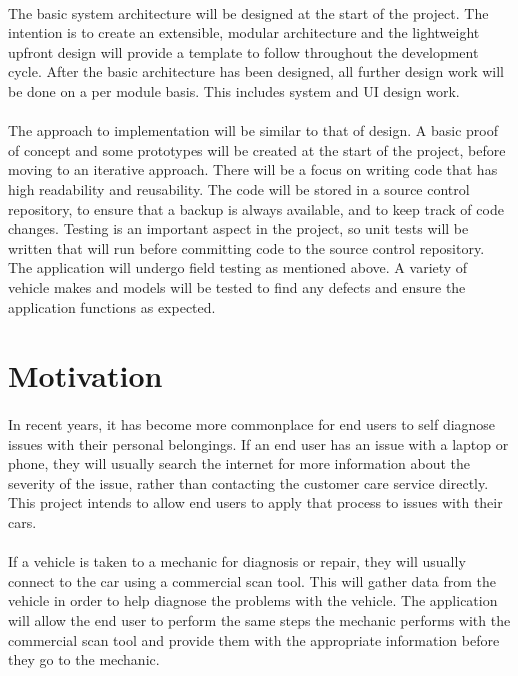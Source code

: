 	\paragraph{}{
	The basic system architecture will be designed at the start of the project. The intention is to create an extensible, modular architecture and the lightweight upfront design will provide a template to follow throughout the development cycle. After the basic architecture has been designed, all further design work will be done on a per module basis. This includes system and UI design work.
	}
	\paragraph{}{
 	The approach to implementation will be similar to that of design. A basic proof of concept and some prototypes will be created at the start of the project, before moving to an iterative approach. There will be a focus on writing code that has high readability and reusability. The code will be stored in a source control repository, to ensure that a backup is always available, and to keep track of code changes. Testing is an important aspect in the project, so unit tests will be written that will run before committing code to the source control repository. The application will undergo field testing as mentioned above. A variety of vehicle makes and models will be tested to find any defects and ensure the application functions as expected. 
	}

\section{Motivation}
	\paragraph{}{
	In recent years, it has become more commonplace for end users to self diagnose issues with their personal belongings. If an end user has an issue with a laptop or phone, they will usually search the internet for more information about the severity of the issue, rather than contacting the customer care service directly. This project intends to allow end users to apply that process to issues with their cars.
	}
	\paragraph{}{
	If a vehicle is taken to a mechanic for diagnosis or repair, they will usually connect to the car using a commercial scan tool. This will gather data from the vehicle in order to help diagnose the problems with the vehicle. The application will allow the end user to perform the same steps the mechanic performs with the commercial scan tool and provide them with the appropriate information before they go to the mechanic.
	}
